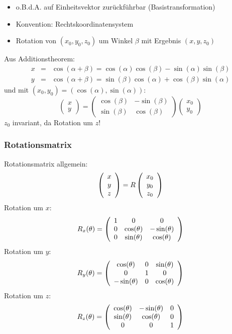 \begin{itemize}
\item o.B.d.A. auf Einheitsvektor zurückführbar (Basistransformation)
\item Konvention: Rechtskoordinatensystem
\item Rotation von $(x_0,y_0,z_0)$ um Winkel $\beta$ mit Ergebnis $(x,y,z_0)$
\end{itemize}
Aus Additionstheorem:
\begin{eqnarray*}
x &=& \cos(\alpha + \beta) = \cos(\alpha) \cos(\beta) - \sin(\alpha) \sin(\beta) \\ y &=& \cos(\alpha + \beta) = \sin(\beta) \cos(\alpha) + \cos(\beta) \sin(\alpha)
\end{eqnarray*}
und mit $(x_0,y_0) = (\cos(\alpha), \sin(\alpha))$:
$$\left( \begin{array}{c} x \\ y \end{array} \right) = \left( \begin{array}{rr} \cos(\beta) & -\sin(\beta) \\ \sin(\beta) & \cos(\beta) \end{array} \right) \left( \begin{array}{c} x_0 \\ y_0 \end{array} \right)$$
$z_0$ invariant, da Rotation um $z$!

\subsubsection*{Rotationsmatrix}

Rotationsmatrix allgemein: $$\left( \begin{array}{c} x \\ y \\ z \end{array} \right) = R \left( \begin{array}{c} x_0 \\ y_0 \\ z_0 \end{array} \right)$$
Rotation um $x$: $$R_x(\theta) = \left( \begin{array}{ccc} 1 & 0 & 0 \\ 0 & \cos(\theta) & - \sin(\theta) \\ 0 & \sin(\theta) & \cos(\theta) \end{array} \right)$$
Rotation um $y$: $$R_y(\theta) = \left( \begin{array}{ccc} \cos(\theta) & 0 & \sin(\theta) \\ 0 & 1 & 0 \\ - \sin(\theta) & 0 & \cos(\theta) \end{array} \right)$$
Rotation um $z$: $$R_z(\theta) = \left( \begin{array}{ccc} \cos(\theta) & - \sin(\theta) & 0 \\ \sin(\theta) & \cos(\theta) & 0 \\ 0 & 0 & 1 \end{array} \right)$$

